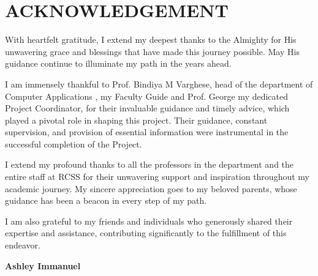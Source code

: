 \chapter*{\centering \LARGE ACKNOWLEDGEMENT}  
\vspace{-1cm}   

\noindent
 With heartfelt gratitude, I extend my deepest thanks to the Almighty for His unwavering grace and blessings that have made this journey possible. May His guidance continue to illuminate my path in the years ahead.  

I am immensely thankful to Prof. Bindiya M Varghese, head of the department of Computer Applications ,  my Faculty Guide and Prof. George my dedicated Project Coordinator, for their invaluable guidance and timely advice, which played a pivotal role in shaping this project. Their guidance, constant supervision, and provision of essential information were instrumental in the successful completion of the Project. 

I extend my profound thanks to all the professors in the department and the entire staff at RCSS for their unwavering support and inspiration throughout my academic journey. My sincere appreciation goes to my beloved parents, whose guidance has been a beacon in every step of my path.  

I am  also grateful to my friends and individuals who generously shared their expertise and assistance, contributing significantly to the fulfillment of this endeavor.  
\vspace{1cm}
\begin{flushright}
\textbf{Ashley Immanuel}
\end{flushright}
